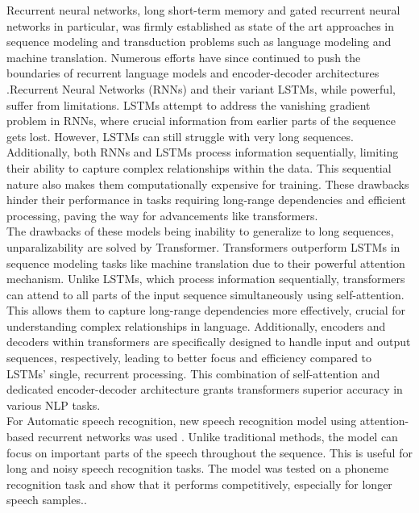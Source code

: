 Recurrent neural networks, long short-term memory and gated recurrent neural networks in particular, was firmly established as state of the art approaches in sequence modeling and transduction problems such as language modeling and machine translation. Numerous efforts have since continued to push the boundaries of recurrent language models and encoder-decoder architectures \cite{vaswani2017attention}.Recurrent Neural Networks (RNNs) and their variant LSTMs, while powerful, suffer from limitations. LSTMs attempt to address the vanishing gradient problem in RNNs, where crucial information from earlier parts of the sequence gets lost. However, LSTMs can still struggle with very long sequences. Additionally, both RNNs and LSTMs process information sequentially, limiting their ability to capture complex relationships within the data. This sequential nature also makes them computationally expensive for training. These drawbacks hinder their performance in tasks requiring long-range dependencies and efficient processing, paving the way for advancements like transformers.\\
The drawbacks of these models being inability to generalize to long sequences, unparalizability are solved by Transformer. Transformers\cite{vaswani2017attention} outperform LSTMs in sequence modeling tasks like machine translation due to their powerful attention mechanism. Unlike LSTMs, which process information sequentially, transformers can attend to all parts of the input sequence simultaneously using self-attention. This allows them to capture long-range dependencies more effectively, crucial for understanding complex relationships in language. Additionally, encoders and decoders within transformers are specifically designed to handle input and output sequences, respectively, leading to better focus and efficiency compared to LSTMs' single, recurrent processing. This combination of self-attention and dedicated encoder-decoder architecture grants transformers superior accuracy in various NLP tasks. \\

For Automatic speech recognition, new speech recognition model using attention-based recurrent networks was used \cite{chorowski2015attention}. Unlike traditional methods, the model can focus on important parts of the speech throughout the sequence. This is useful for long and noisy speech recognition tasks. The model was tested  on a phoneme recognition task and show that it performs competitively, especially for longer speech samples.\cite{chorowski2015attention}. \newline

